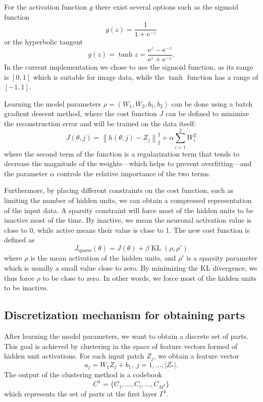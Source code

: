 \documentclass[runningheads]{llncs}
\newcommand{\KL}{\mathop{\textrm{KL}}}
\begin{document}
For the activation function $g$ there exist several options such as the sigmoid function
\begin{equation}
  g(z)=\frac{1}{1+\text{e}^{-z}}
\end{equation}
or the hyperbolic tangent
\begin{equation}
  g(z)=\tanh z=\frac{\text{e}^z-\text{e}^{-z}}{\text{e}^z+\text{e}^{-z}}.
\end{equation}
In the current implementation we chose to use the sigmoid function, as its range is $[0,1]$ which is suitable for image data, while the $\tanh$ function has a range of $[-1,1]$.

Learning the model parameters $\rho=(W_1,W_2,b_1,b_2)$ can be done using a batch gradient descent method, where the cost function $J$ can be defined to minimize the reconstruction error and will be trained on the data itself:
\begin{equation}
   J(\theta,j)=\left\|h(\theta,j)-Z_j\right\|_2^2 + \alpha\sum_{i=1}^{2} W_i^2
\end{equation}
where the second term of the function is a regularization term that tends to decrease the magnitude of the weights---which helps to prevent overfitting---and the parameter $\alpha$ controls the relative importance of the two terms.
 
Furthermore, by placing different constraints on the cost function, such as limiting the number of hidden units, we can obtain a compressed representation of the input data. A sparsity constraint will force most of the hidden units to be inactive most of the time. By inactive, we mean the neuronal activation value is close to 0, while active means their value is close to 1. The new cost function is defined as
\begin{equation}
J_{\textrm{sparse}}(\theta)=J(\theta)+\beta \KL(\rho,\rho')
\end{equation}
where $\rho$ is the mean activation of the hidden units, and $\rho'$ is a sparsity parameter which is usually a small value close to zero. By minimizing the KL divergence, we thus force $\rho$ to be close to zero. In other words, we force most of the hidden units to be inactive.

\subsection{Discretization mechanism for obtaining parts} 

After learning the model parameters, we want to obtain a discrete set of parts. This goal is achieved by clustering in the space of feature vectors formed of hidden unit activations. For each input patch $Z_j$, we obtain a feature vector
\begin{equation}
a_j=W_1Z_j+b_1, \;j=1,\ldots,|Z_*|.
\end{equation}
The output of the clustering method is a codebook
\begin{equation}
C^1=\{C_1,\ldots,C_i,\ldots,C_{M^1}\}
\end{equation}
which represents the set of parts at the first layer $\Gamma^{1}$. 
\end{document}

